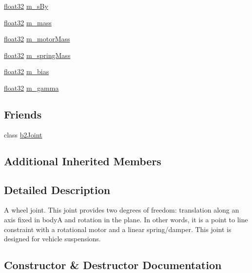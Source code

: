 \begin{DoxyCompactItemize}
\item 
\mbox{\hyperlink{b2_settings_8h_aacdc525d6f7bddb3ae95d5c311bd06a1}{float32}} \mbox{\hyperlink{classb2_wheel_joint_a4fa320609b2942eee344ac0d91003444}{m\+\_\+s\+By}}
\item 
\mbox{\hyperlink{b2_settings_8h_aacdc525d6f7bddb3ae95d5c311bd06a1}{float32}} \mbox{\hyperlink{classb2_wheel_joint_a80abc7c0fe5a4d6f362ec5cb13214ec1}{m\+\_\+mass}}
\item 
\mbox{\hyperlink{b2_settings_8h_aacdc525d6f7bddb3ae95d5c311bd06a1}{float32}} \mbox{\hyperlink{classb2_wheel_joint_a64d20e079b2638995c7faa5d3a2aed68}{m\+\_\+motor\+Mass}}
\item 
\mbox{\hyperlink{b2_settings_8h_aacdc525d6f7bddb3ae95d5c311bd06a1}{float32}} \mbox{\hyperlink{classb2_wheel_joint_ab24b6e3ad48961de7d78e4476531dd30}{m\+\_\+spring\+Mass}}
\item 
\mbox{\hyperlink{b2_settings_8h_aacdc525d6f7bddb3ae95d5c311bd06a1}{float32}} \mbox{\hyperlink{classb2_wheel_joint_a82bec93fb4a2a3702455bede3d5c6ac8}{m\+\_\+bias}}
\item 
\mbox{\hyperlink{b2_settings_8h_aacdc525d6f7bddb3ae95d5c311bd06a1}{float32}} \mbox{\hyperlink{classb2_wheel_joint_a3d4c8b3e96b517d13693285e63a917fb}{m\+\_\+gamma}}
\end{DoxyCompactItemize}
\subsection*{Friends}
\begin{DoxyCompactItemize}
\item 
class \mbox{\hyperlink{classb2_wheel_joint_a54ade8ed3d794298108d7f4c4e4793fa}{b2\+Joint}}
\end{DoxyCompactItemize}
\subsection*{Additional Inherited Members}


\subsection{Detailed Description}
A wheel joint. This joint provides two degrees of freedom\+: translation along an axis fixed in bodyA and rotation in the plane. In other words, it is a point to line constraint with a rotational motor and a linear spring/damper. This joint is designed for vehicle suspensions. 

\subsection{Constructor \& Destructor Documentation}
\mbox{\label{classb2_wheel_joint_a9c8bbb1068ddb46d074fe91802dd6a39}} 

